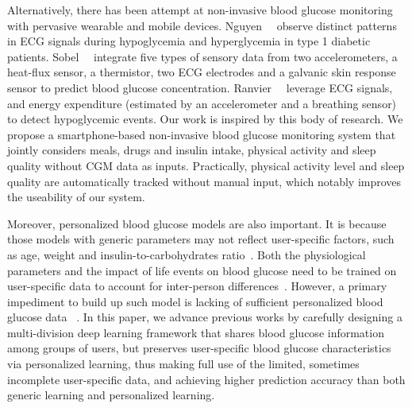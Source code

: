 Alternatively, there has been attempt at non-invasive blood glucose monitoring with pervasive wearable and mobile devices.
Nguyen~\etal~\cite{bib:EMBC12:Nguyen} observe distinct patterns in ECG signals during hypoglycemia and hyperglycemia in type 1 diabetic patients.
Sobel~\etal~\cite{bib:JDST14:Sobel} integrate five types of sensory data from two accelerometers, a heat-flux sensor, a thermistor, two ECG electrodes and a galvanic skin response sensor to predict blood glucose concentration.
Ranvier~\etal~\cite{bib:SEMPER16:Ranvier} leverage ECG signals, and energy expenditure (estimated by an accelerometer and a breathing sensor) to detect hypoglycemic events.
Our work is inspired by this body of research. We propose a smartphone-based non-invasive blood glucose monitoring system that jointly considers meals, drugs and insulin intake, physical activity and sleep quality without CGM data as inputs.
Practically, physical activity level and sleep quality are automatically tracked without manual input, which notably improves the useability of our system.


Moreover, personalized blood glucose models are also important. It is because those models with generic parameters may not reflect user-specific factors, such as age, weight and insulin-to-carbohydrates ratio~\cite{bib:IJNMBE16:Oviedo}.
Both the physiological parameters and the impact of life events on blood glucose need to be trained on user-specific data to account for inter-person differences~\cite{bib:ICMLA13:Bunescu}.
However, a primary impediment to build up such model is lacking of sufficient personalized blood glucose data ~\cite{bib:KDHealth16:Marling}.
In this paper, we advance previous works by carefully designing a multi-division deep learning framework that shares blood glucose information among groups of users, but preserves user-specific blood glucose characteristics via personalized learning, thus making full use of the limited, sometimes incomplete user-specific data, and achieving higher prediction accuracy than both generic learning and personalized learning.

